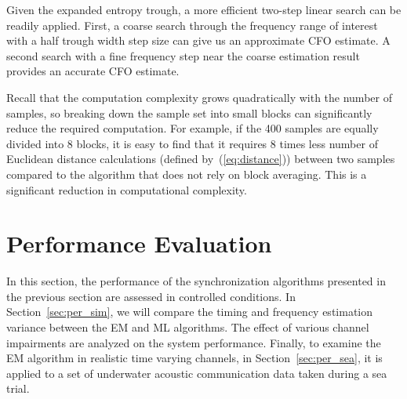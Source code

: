 \documentclass[journal,comsoc,onecolumn, 12pt,draftclsnofoot]{IEEEtran}
\begin{document}
Given the expanded entropy trough, a more efficient two-step linear search can be readily applied.
First, a coarse search through the frequency range of interest with a half trough width step size can give us an approximate CFO estimate.
A second search with a fine frequency step near the coarse estimation result provides an accurate CFO estimate.

Recall that the computation complexity grows quadratically with the number of samples, so breaking down the sample set into small blocks can significantly reduce the required computation.
For example, if the 400 samples are equally divided into 8 blocks, it is easy to find that it requires 8 times less number of Euclidean distance calculations (defined by~(\ref{eq:distance})) between two samples compared to the algorithm that does not rely on block averaging. This is a significant reduction in computational complexity. 




\section{Performance Evaluation}
\label{sec:perfo}
In this section, the performance of the synchronization algorithms presented in the previous section are assessed in controlled conditions.
In Section~\ref{sec:per_sim}, we will compare the timing and frequency estimation variance between the EM and ML algorithms.
The effect of various channel impairments
are analyzed on the system performance.
Finally, to examine the EM algorithm in realistic time varying channels, in Section~\ref{sec:per_sea}, it is applied to a set of underwater acoustic communication data taken during a sea trial.
\end{document}
